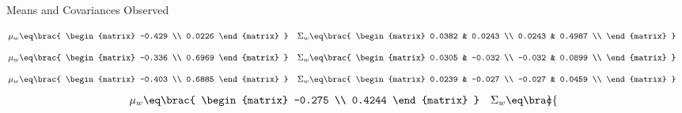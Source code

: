 \documentclass{article}
\begin{document}
\begin{question}

	\begin{qsection}{Means and Covariances Observed}

		\begin{enumerate}
			\ditem[N = 1]
				\begin{align*}
					\mu_w		&\eq	\brac{
						\begin{matrix}
							-0.429 \\
							0.0226
						\end{matrix}
					} &
					\Sigma_w	&\eq	\brac{
						\begin{matrix}
							0.0382 &	0.0243	\\
							0.0243 &	0.4987	\\
						\end{matrix}
					}
				\end{align*}
			\ditem[N = 2]
				\begin{align*}
					\mu_w		&\eq	\brac{
						\begin{matrix}
							-0.336 \\
							0.6969
						\end{matrix}
					} &
					\Sigma_w	&\eq	\brac{
						\begin{matrix}
							0.0305 &	-0.032	\\
							-0.032 &	0.0899	\\
						\end{matrix}
					}
				\end{align*}
			\ditem[N = 5]
				\begin{align*}
					\mu_w		&\eq	\brac{
						\begin{matrix}
							-0.403 \\
							0.6885
						\end{matrix}
					} &
					\Sigma_w	&\eq	\brac{
						\begin{matrix}
							0.0239 &	-0.027	\\
							-0.027 &	0.0459	\\
						\end{matrix}
					}
				\end{align*}
			\ditem[N = 10]
				\begin{align*}
					\mu_w		&\eq	\brac{
						\begin{matrix}
							-0.275 \\
							0.4244
						\end{matrix}
					} &
					\Sigma_w	&\eq	\brac{
						\begin{matrix}

\end{matrix}}
\end{align*}
\end{enumerate}
\end{qsection}
\end{question}
\end{document}
